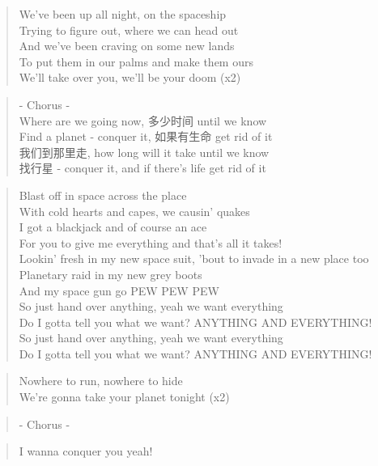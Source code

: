 \begin{verse}
We've been up all night, on the spaceship\\
Trying to figure out, where we can head out\\
And we've been craving on some new lands\\
To put them in our palms and make them ours\\
We'll take over you, we'll be your doom (x2)
\end{verse}

\begin{verse}
- Chorus -\\
Where are we going now, 多少时间 until we know\\
Find a planet - conquer it, 如果有生命 get rid of it\\
我们到那里走, how long will it take until we know\\
找行星 - conquer it, and if there's life get rid of it
\end{verse}

\begin{verse}
Blast off in space across the place\\
With cold hearts and capes, we causin' quakes\\
I got a blackjack and of course an ace\\
For you to give me everything and that's all it takes!\\
Lookin' fresh in my new space suit, 'bout to invade in a new place too\\
Planetary raid in my new grey boots\\
And my space gun go PEW PEW PEW\\
So just hand over anything, yeah we want everything\\
Do I gotta tell you what we want? ANYTHING AND EVERYTHING!\\
So just hand over anything, yeah we want everything\\
Do I gotta tell you what we want? ANYTHING AND EVERYTHING!
\end{verse}

\begin{verse}
Nowhere to run, nowhere to hide\\
We're gonna take your planet tonight (x2)
\end{verse}

\begin{verse}
- Chorus -
\end{verse}

\begin{verse}
I wanna conquer you yeah!
\end{verse}
\clearpage






